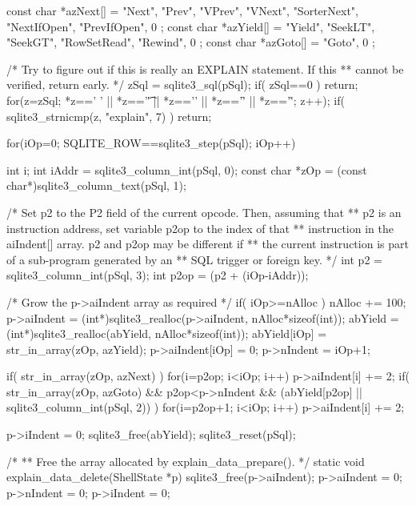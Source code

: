 \begin{Codex}[label=shell.c,numbers=left]
{{  const char *azNext[] = { "Next", "Prev", "VPrev", "VNext", "SorterNext",
                           "NextIfOpen", "PrevIfOpen", 0 };
  const char *azYield[] = { "Yield", "SeekLT", "SeekGT", "RowSetRead",
                            "Rewind", 0 };
  const char *azGoto[] = { "Goto", 0 };

  /* Try to figure out if this is really an EXPLAIN statement. If this
  ** cannot be verified, return early.  */
  zSql = sqlite3_sql(pSql);
  if( zSql==0 ) return;
  for(z=zSql; *z==' ' || *z=='\t' || *z=='\n' || *z=='\f' || *z=='\r'; z++);
  if( sqlite3_strnicmp(z, "explain", 7) ) return;

  for(iOp=0; SQLITE_ROW==sqlite3_step(pSql); iOp++){
    int i;
    int iAddr = sqlite3_column_int(pSql, 0);
    const char *zOp = (const char*)sqlite3_column_text(pSql, 1);

    /* Set p2 to the P2 field of the current opcode. Then, assuming that
    ** p2 is an instruction address, set variable p2op to the index of that
    ** instruction in the aiIndent[] array. p2 and p2op may be different if
    ** the current instruction is part of a sub-program generated by an
    ** SQL trigger or foreign key.  */
    int p2 = sqlite3_column_int(pSql, 3);
    int p2op = (p2 + (iOp-iAddr));

    /* Grow the p->aiIndent array as required */
    if( iOp>=nAlloc ){
      nAlloc += 100;
      p->aiIndent = (int*)sqlite3_realloc(p->aiIndent, nAlloc*sizeof(int));
      abYield = (int*)sqlite3_realloc(abYield, nAlloc*sizeof(int));
    }
    abYield[iOp] = str_in_array(zOp, azYield);
    p->aiIndent[iOp] = 0;
    p->nIndent = iOp+1;

    if( str_in_array(zOp, azNext) ){
      for(i=p2op; i<iOp; i++) p->aiIndent[i] += 2;
    }
    if( str_in_array(zOp, azGoto) && p2op<p->nIndent
     && (abYield[p2op] || sqlite3_column_int(pSql, 2))
    ){
      for(i=p2op+1; i<iOp; i++) p->aiIndent[i] += 2;
    }
  }

  p->iIndent = 0;
  sqlite3_free(abYield);
  sqlite3_reset(pSql);
}

/*
** Free the array allocated by explain_data_prepare().
*/
static void explain_data_delete(ShellState *p){
  sqlite3_free(p->aiIndent);
  p->aiIndent = 0;
  p->nIndent = 0;
  p->iIndent = 0;
}

}
\end{Codex}
